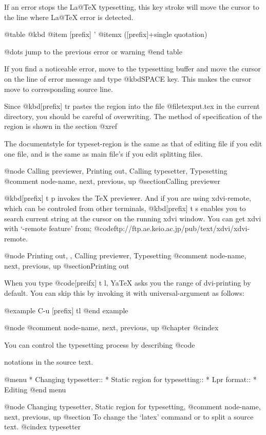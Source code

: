   If an error  stops the La@TeX{}  typesetting, this  key stroke will
move the cursor to the line where La@TeX{} error is detected.

@table @kbd
@item [prefix] '
@itemx ([prefix]+single quotation)

        @dots{} jump to the previous error or warning
@end table

  If you find a noticeable error, move to the typesetting buffer and move
the cursor on the line of error message and type @kbd{SPACE} key.  This
makes the cursor move to corresponding source line.

  Since @kbd{[prefix] tr} pastes the region into the file
@file{texput.tex} in the current directory, you should be careful of
overwriting.  The method of specification of the region is shown in the
section @xref{%

  The documentstyle  for typeset-region is the same as that of editing
file if you edit one  file,  and is the same as main file's if you
edit splitting files.

@node Calling previewer, Printing out, Calling typesetter, Typesetting
@comment  node-name,  next,  previous,  up
@section{Calling previewer}

  @kbd{[prefix] t p} invokes the TeX previewer.  And if you are using
xdvi-remote, which can be controled from other terminals, @kbd{[prefix] t
s} enables you to search current string at the cursor on the running xdvi
window.  You can get xdvi with `-remote feature' from;
@code{ftp://ftp.ae.keio.ac.jp/pub/text/xdvi/xdvi-remote}.

@node Printing out,  , Calling previewer, Typesetting
@comment  node-name,  next,  previous,  up
@section{Printing out}

  When you type @code{[preifx] t l}, YaTeX asks you the range of
dvi-printing by default.  You can skip this by invoking it with
universal-argument as follows:

@example
        C-u [prefix] tl
@end example

@node %
@comment  node-name,  next,  previous,  up
@chapter %
@cindex %

  You can control the typesetting process by describing @code{%
notations in the source text.

@menu
* Changing typesetter::         
* Static region for typesetting::  
* Lpr format::                  
* Editing %
@end menu

@node Changing typesetter, Static region for typesetting, %
@comment  node-name,  next,  previous,  up
@section To change the `latex' command or to split a source text.
@cindex typesetter

}}
